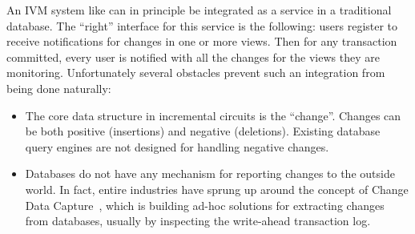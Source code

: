 An IVM system like \dbsp can in principle be integrated as a service
in a traditional database.  The ``right'' interface for this service
is the following: users register to receive notifications for changes
in one or more views.  Then for any transaction committed, every user
is notified with all the changes for the views they are monitoring.
Unfortunately several obstacles prevent such an integration from being
done naturally:
\begin{itemize}
  \item The core data structure in incremental circuits is the
    ``change''.  Changes can be both positive (insertions) and
    negative (deletions).  Existing database query engines are not
    designed for handling negative changes.
  \item Databases do not have any mechanism for reporting changes to
    the outside world.  In fact, entire industries have sprung up
    around the concept of Change Data Capture~\cite{cdc}, which is
    building ad-hoc solutions for extracting changes from databases,
    usually by inspecting the write-ahead transaction log.
\end{itemize}

